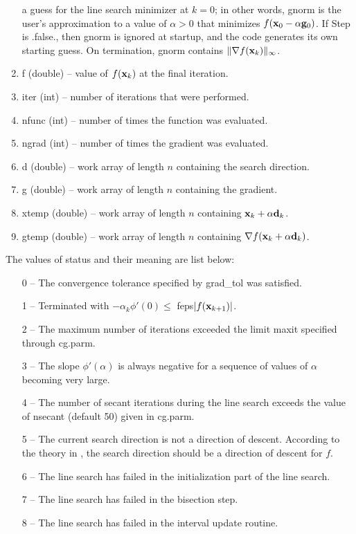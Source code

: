 \documentclass [12pt] {article}
\newcommand{\m}[1]{{\bf{#1}}}
\begin{document}
\begin{enumerate}
a guess for the line search minimizer at $k = 0$;
in other words, {\sc gnorm} is the
user's approximation to a value of $\alpha > 0$ that minimizes
$f (\m{x}_0 - \alpha \m{g}_0)$.
If {\sc Step} is .false., then {\sc gnorm} is ignored at startup,
and the code generates its own starting guess.
On termination, {\sc gnorm} contains $\|\nabla f (\m{x}_k)\|_{\infty}$.
\item
{\sc f} (double) -- value of $f (\m{x}_k)$ at the final iteration.
\item
{\sc iter} (int) -- number of iterations that were performed.
\item
{\sc nfunc} (int) -- number of times the function was evaluated.
\item
{\sc ngrad} (int) -- number of times the gradient was evaluated.
\item
{\sc d} (double) -- work array of length $n$ containing the search direction.
\item
{\sc g} (double) -- work array of length $n$ containing the gradient.
\item
{\sc xtemp} (double) -- work array of length $n$ containing
$\m{x}_k + \alpha \m{d}_k$.
\item
{\sc gtemp} (double) -- work array of length $n$ containing
$\nabla f ( \m{x}_k + \alpha \m{d}_k)$.
\end{enumerate}

The values of status and their meaning are list below:
\begin{itemize}
\item [0 --]
The convergence tolerance specified by {\sc grad\_tol} was satisfied.
\item [1 --]
Terminated with $-\alpha_k \phi' (0) \le$ {\sc feps}$|f(\m{x}_{k+1})|$.
\item [2 --]
The maximum number of iterations exceeded the limit
{\sc maxit} specified through {\sc cg.parm}.
\item [3 --]
The slope $\phi ' (\alpha)$ is always negative for a sequence of values
of $\alpha$ becoming very large.
\item [4 --]
The number of secant iterations during the line search exceeds
the value of {\sc nsecant} (default 50) given in {\sc cg.parm}.
\item [5 --]
The current search direction is not a direction of descent.
According to the theory in \cite{hz, hz2},
the search direction should be a direction of descent for $f$.
\item [6 --]
The line search has failed in the initialization part of the line search.
\item [7 --]
The line search has failed in the bisection step.
\item [8 --]
The line search has failed in the interval update routine.
\end{itemize}
\end{document}
